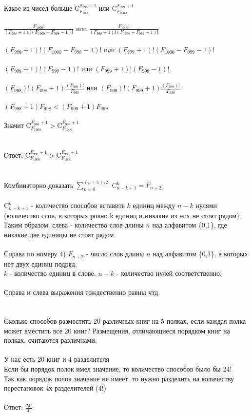 \documentclass{article}
\begin{document}
\section{}
Какое из чисел больше $\text{C}^{F_{998}+1}_{F_{1000}}$ или $\text{C}^{F_{999}+1}_{F_{1000}}$\\\\
$\frac{F_{1000}!}{(F_{998}+1)!(F_{1000}-F_{998}-1)!}$ или $\frac{F_{1000}!}{(F_{999}+1)!(F_{1000}-F_{999}-1)!}$\\
\\$(F_{998}+1)!(F_{1000}-F_{998}-1)!$ или $(F_{999}+1)!(F_{1000}-F_{999}-1)!$\\\\
$(F_{998}+1)!(F_{999}-1)!$ или $(F_{999}+1)!(F_{998}-1)!$\\\\
$(F_{998})!(F_{998}+1)\frac{(F_{999})!}{F_{999}}$ или $(F_{999})!(F_{999}+1)\frac{(F_{998})!}{F_{998}}$\\\\
$(F_{998}+1)F_{998}<(F_{999}+1)F_{999}$\\\\
Значит $\text{C}^{F_{998}+1}_{F_{1000}} > \text{C}^{F_{999}+1}_{F_{1000}}$\\\\\\
Ответ: $\text{C}^{F_{998}+1}_{F_{1000}} > \text{C}^{F_{999}+1}_{F_{1000}}$
\section{}
Комбинаторно доказать $\sum\limits_{k=0}^{(n+1)/2}$ C$^{k}_{n-k+1} = F_{n+2}$\\\\
C$^{k}_{n-k+1}$ - количество способов вставить $k$ единиц между $n-k$ нулями (количество слов, в которых ровно k единиц и никакие из них не стоят рядом).\\
Таким образом, слева - количество слов длины $n$ над алфавитом \{0,1\}, где никакие две единицы не стоят рядом.\\\\
Справа по номеру 4) $F_{n+2}$ - число слов длины $n$ над алфавитом \{0,1\}, в которых нет двух единиц подряд.\\
$k$ - количество единиц в слове. $n-k$ - количество нулей соответственно.
\\\\
Справа и слева выражения тождественно равны чтд.
\section{}
Сколько способов разместить 20 различных книг на 5 полках, если каждая полка может вместить все 20 книг? Размещения, отличающиеся порядком книг на полках, считаются различнами.\\\\
У нас есть 20 книг и 4 разделителя\\
Если бы порядок полок имел значение, то количество способов было бы 24!\\
Так как порядок полок значение не имеет, то нужно разделить на количеству перестановок 4х разделителей (4!)\\\\
Ответ: $\frac{24!}{4!}$
\end{document}
